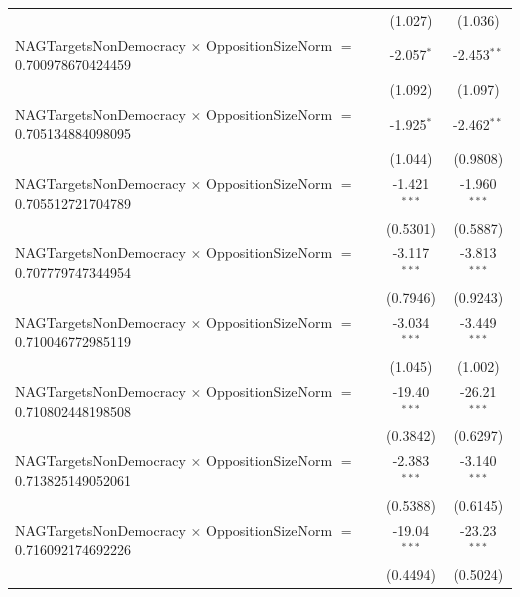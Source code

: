 \begin{tabular}{lcc}
                                                                                & (1.027)              & (1.036)\\   
   NAGTargetsNonDemocracy $\times$ OppositionSizeNorm $=$ 0.700978670424459     & -2.057$^{*}$         & -2.453$^{**}$\\   
                                                                                & (1.092)              & (1.097)\\   
   NAGTargetsNonDemocracy $\times$ OppositionSizeNorm $=$ 0.705134884098095     & -1.925$^{*}$         & -2.462$^{**}$\\   
                                                                                & (1.044)              & (0.9808)\\   
   NAGTargetsNonDemocracy $\times$ OppositionSizeNorm $=$ 0.705512721704789     & -1.421$^{***}$       & -1.960$^{***}$\\   
                                                                                & (0.5301)             & (0.5887)\\   
   NAGTargetsNonDemocracy $\times$ OppositionSizeNorm $=$ 0.707779747344954     & -3.117$^{***}$       & -3.813$^{***}$\\   
                                                                                & (0.7946)             & (0.9243)\\   
   NAGTargetsNonDemocracy $\times$ OppositionSizeNorm $=$ 0.710046772985119     & -3.034$^{***}$       & -3.449$^{***}$\\   
                                                                                & (1.045)              & (1.002)\\   
   NAGTargetsNonDemocracy $\times$ OppositionSizeNorm $=$ 0.710802448198508     & -19.40$^{***}$       & -26.21$^{***}$\\   
                                                                                & (0.3842)             & (0.6297)\\   
   NAGTargetsNonDemocracy $\times$ OppositionSizeNorm $=$ 0.713825149052061     & -2.383$^{***}$       & -3.140$^{***}$\\   
                                                                                & (0.5388)             & (0.6145)\\   
   NAGTargetsNonDemocracy $\times$ OppositionSizeNorm $=$ 0.716092174692226     & -19.04$^{***}$       & -23.23$^{***}$\\   
                                                                                & (0.4494)             & (0.5024)\\   

\end{tabular}
